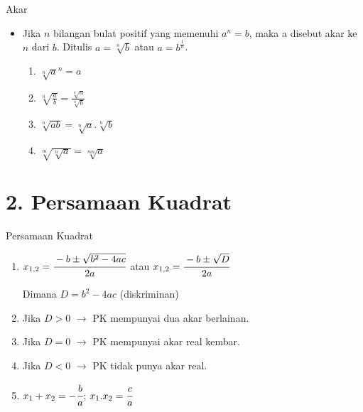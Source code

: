 \documentclass{beamer}
\begin{document}
\begin{frame}[t]{Akar}
\begin{itemize}
\item Jika $n$ bilangan bulat positif yang memenuhi $a^n=b$, maka a disebut akar ke $n$ dari $b$. Ditulis  $a=\sqrt[n]{b}$  atau $a=b^\frac{1}{n}$.
\begin{block}{}
\begin{enumerate}
    \item ${\sqrt[n]{a}}^n = a$
    \\
    \hfill \item $\sqrt[n]{\frac{a}{b}}=\frac{\sqrt[n]{a}}{\sqrt[n]{b}}$
    \\
    \hfill \item $\sqrt[n]{ab}=\sqrt[n]{a} . \sqrt[n]{b}$
    \\
    \hfill \item $\sqrt[m]{\sqrt[n]{a}}=\sqrt[mn]{a}$
    \\
\end{enumerate}
\end{block}
\end{itemize}
\end{frame}

\section{2. Persamaan Kuadrat}
\begin{frame}[t,fragile]{Persamaan Kuadrat}
\center {}
\newline
\newline
\begin{enumerate}

\item $x_{1,2}=\cfrac{-b \pm \sqrt{b^2-4ac}}{2a}$ atau $x_{1,2}=\cfrac{-b\pm\sqrt{D}}{2a}$ 
\\
\hfill

Dimana $D = b^2 - 4ac$ (diskriminan)
\item Jika $D > 0$ $\rightarrow$ PK mempunyai dua akar berlainan.
\item Jika $D = 0$ $\rightarrow$ PK mempunyai akar real kembar. 
\item Jika $D < 0$ $\rightarrow$ PK tidak punya akar real.
\item $x_1 + x_2 = - \cfrac{b}{a}$; $x_1.x_2=\cfrac{c}{a}$
\end{enumerate}
\end{frame}
\end{document}
